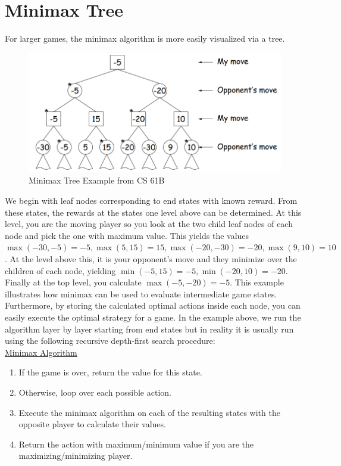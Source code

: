 \documentclass[12pt, letterpaper]{article}
\begin{document}
\section*{Minimax Tree}
For larger games, the minimax algorithm is more easily visualized via a tree.
\begin{figure}[H]
\centering
\includegraphics[scale=0.4]{minimax-tree.png}
\caption*{Minimax Tree Example from CS 61B}
\end{figure}
We begin with leaf nodes corresponding to end states with known reward. From these states, the rewards at the states one level above can be determined. At this level, you are the moving player so you look at the two child leaf nodes of each node and pick the one with maximum value. This yields the values $\max(-30, -5) = -5, \max(5, 15) = 15,\max(-20, -30) = -20,\max(9, 10) = 10$. At the level above this, it is your opponent's move and they minimize over the children of each node, yielding $\min(-5,15)=-5, \min(-20,10)=-20$. Finally at the top level, you calculate $\max(-5, -20) = -5$.
\newpage
This example illustrates how minimax can be used to evaluate intermediate game states. Furthermore, by storing the calculated optimal actions inside each node, you can easily execute the optimal strategy for a game. In the example above, we run the algorithm layer by layer starting from end states but in reality it is usually run using the following recursive depth-first search procedure: \\[0.2cm]
\underline{Minimax Algorithm}
\begin{enumerate}
    \item If the game is over, return the value for this state.
    \item Otherwise, loop over each possible action.
    \item Execute the minimax algorithm on each of the resulting states with the opposite player to calculate their values.
    \item Return the action with maximum/minimum value if you are the maximizing/minimizing player.
\end{enumerate}
\end{document}
